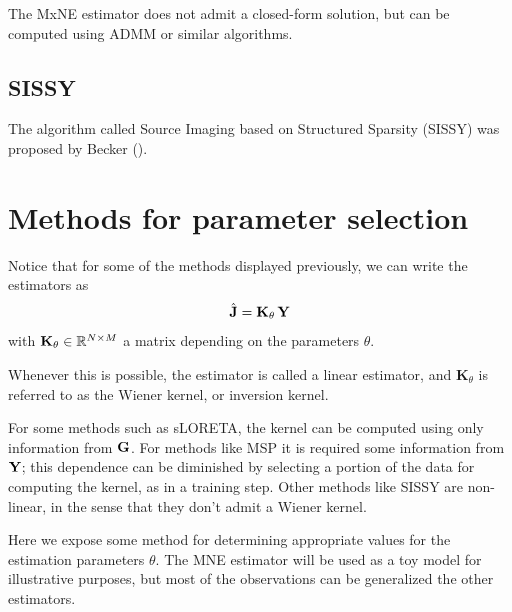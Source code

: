 The MxNE estimator does not admit a closed-form solution, but can be computed using ADMM or similar algorithms.

\subsection{SISSY}

The algorithm called Source Imaging based on Structured Sparsity (SISSY) was proposed by Becker ().
%
%


\section{Methods for parameter selection}

Notice that for some of the methods displayed previously, we can write the estimators as
\begin{equation}
\hat{\mathbf{J}}
=
\mathbf{K}_{\theta}\, \mathbf{Y}
\end{equation}
with $\mathbf{K}_\theta \in \mathbb{R}^{N\times M}$ a matrix depending on the parameters $\theta$.

Whenever this is possible, the estimator is called a linear estimator, and $\mathbf{K}_\theta$ is referred to as the {Wiener kernel}, or inversion kernel.

For some methods such as sLORETA, the kernel can be computed using only information from $\mathbf{G}$. 
%
For methods like MSP it is required some information from $\mathbf{Y}$; this dependence can be diminished by selecting a portion of the data for computing the kernel, as in a training step.
%
Other methods like SISSY are non-linear, in the sense that they don't admit a Wiener kernel.


Here we expose some method for determining appropriate values for the estimation parameters $\theta$.
%
The MNE estimator will be used as a toy model for illustrative purposes, but most of the observations can be generalized  the other estimators.

